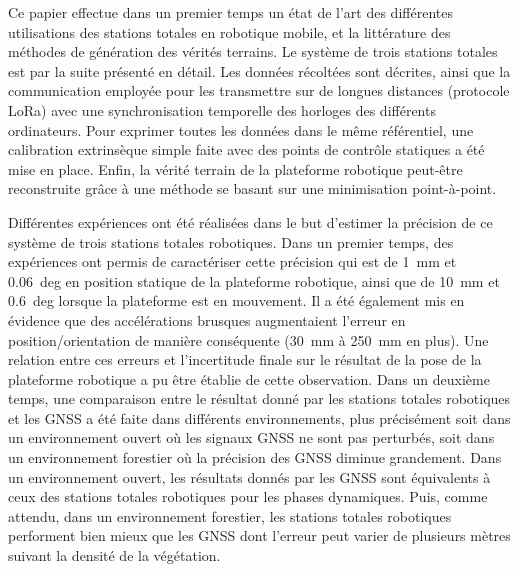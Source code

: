 \begin{center}
    \textbf{}
\end{center}

Ce papier effectue dans un premier temps un état de l'art des différentes utilisations des stations totales en robotique mobile, et la littérature des méthodes de génération des vérités terrains.
Le système de trois stations totales est par la suite présenté en détail.
Les données récoltées sont décrites, ainsi que la communication employée pour les transmettre sur de longues distances (protocole LoRa) avec une synchronisation temporelle des horloges des différents ordinateurs.
Pour exprimer toutes les données dans le même référentiel, une calibration extrinsèque simple faite avec des points de contrôle statiques a été mise en place. 
Enfin, la vérité terrain de la plateforme robotique peut-être reconstruite grâce à une méthode se basant sur une minimisation point-à-point.

Différentes expériences ont été réalisées dans le but d'estimer la précision de ce système de trois stations totales robotiques.
Dans un premier temps, des expériences ont permis de caractériser cette précision qui est de \SI{1}{mm} et \SI{0.06}{deg} en position statique de la plateforme robotique, ainsi que de \SI{10}{mm} et \SI{0.6}{deg} lorsque la plateforme est en mouvement.
Il a été également mis en évidence que des accélérations brusques augmentaient l'erreur en position/orientation de manière conséquente (\SI{30}{mm} à \SI{250}{mm} en plus).
Une relation entre ces erreurs et l'incertitude finale sur le résultat de la pose de la plateforme robotique a pu être établie de cette observation.
Dans un deuxième temps, une comparaison entre le résultat donné par les stations totales robotiques et les \ac{GNSS} a été faite dans différents environnements, plus précisément soit dans un environnement ouvert où les signaux \ac{GNSS} ne sont pas perturbés, soit dans un environnement forestier où la précision des \ac{GNSS} diminue grandement.
Dans un environnement ouvert, les résultats donnés par les \ac{GNSS} sont équivalents à ceux des stations totales robotiques pour les phases dynamiques.
Puis, comme attendu, dans un environnement forestier, les stations totales robotiques performent bien mieux que les \ac{GNSS} dont l'erreur peut varier de plusieurs mètres suivant la densité de la végétation.

